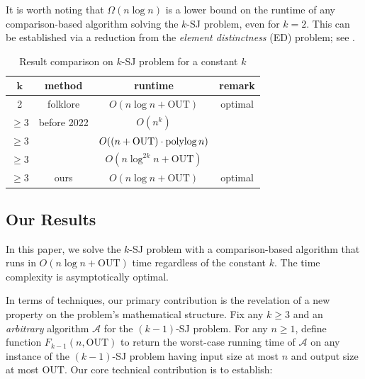 \documentclass[sigconf]{acmart}
\def\vgap{\vspace{1mm}}
\def\figcapup{\vspace{-0mm}}
\def\figcapdown{\vspace{-0mm}}
\def\A{\mathcal{A}}
\def\out{\mathrm{OUT}}
\begin{document}
\vgap 

It is worth noting that $\Omega(n \log n)$ is a lower bound on the runtime of any comparison-based algorithm solving the $k$-SJ problem, even for $k = 2$. This can be established via a reduction from the {\em element distinctness} (ED) problem; see \cite{dl79}.


\begin{table} 
    \begin{tabular}{c|c|c|c} 
        $\bm{k}$ & {\bf method} & {\bf runtime} & {\bf remark} \\
        \hline\hline 
        2 & folklore & $O(n \log n + \out)$ & optimal \\ 
        \hline
        $\ge 3$ & before 2022 & $O(n^k)$ &  \\
        $\ge 3$ & \cite{ty22} & $O((n + \out) \cdot \polylog n)$ & \\
        $\ge 3$ & \cite{kcko22} & $O(n \log^{2k} n + \out)$ & \\
        \hline
        $\ge 3$ & ours & $O(n \log n + \out)$ & optimal
    \end{tabular}
    
    \vspace{3mm}
    \figcapup 
    \caption{Result comparison on $k$-SJ problem for a constant $k$}
    \label{tab:results-com}
    \figcapdown \vspace{-5mm}
\end{table}

\subsection{Our Results} \label{sec:intro:ours} 

In this paper, we solve the $k$-SJ problem with a comparison-based algorithm that runs in $O(n \log n + \out)$ time regardless of the constant $k$. The time complexity is asymptotically optimal.

\vgap 

In terms of techniques, our primary contribution is the revelation of a new property on the problem's mathematical structure. Fix any $k \ge 3$ and an {\em arbitrary} algorithm $\A$ for the $(k-1)$-SJ problem. For any $n \ge 1$, define function $F_{k-1}(n, \out)$ to return the worst-case running time of $\A$ on any instance of the $(k-1)$-SJ problem having input size at most $n$ and output size at most $\out$. Our core technical contribution is to establish:
\end{document}
